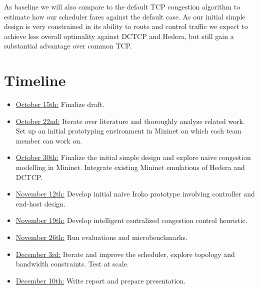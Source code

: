\documentclass[sigconf]{acmart}
\begin{document}
As baseline we will also compare to the default TCP congestion algorithm to estimate how our scheduler fares against the default case. As our initial simple design is very constrained in its ability to route and control traffic we expect to achieve less overall optimality against DCTCP and Hedera, but still gain a substantial advantage over common TCP.

\section{Timeline}
\label{sec:timeline}
\begin{itemize}
    \item \underline{October 15th:} Finalize draft.
    \item \underline{ October 22nd:} Iterate over literature and thoroughly analyze related work. Set up an initial prototyping environment in Mininet on which each team member can work on.
    \item \underline{October 30th:} Finalize the initial simple design and explore naive congestion modelling in Mininet. Integrate existing Mininet emulations of Hedera and DCTCP.
    \item \underline{November 12th:} Develop initial naive Iroko prototype involving controller and end-host design.
    \item \underline{November 19th:} Develop intelligent centralized congestion control heuristic.
    \item \underline{November 26th:} Run evaluations and microbenchmarks.
    \item \underline{December 3rd:} Iterate and improve the scheduler, explore topology and bandwidth constraints. Test at scale.
    \item \underline{December 10th:} Write report and prepare presentation.
\end{itemize}



 
\end{document}
